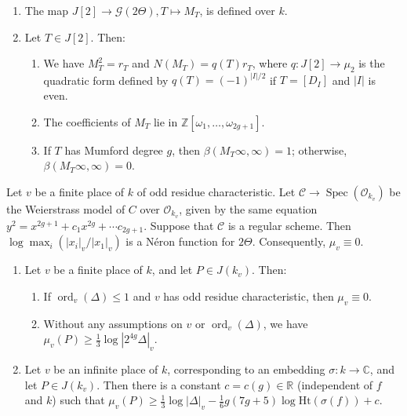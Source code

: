 \documentclass[10pt,a4paper]{amsart}
\DeclareMathOperator{\Spec}{Spec}
\DeclareMathOperator{\ord}{ord}
\newcommand{\R}{\mathbb{R}}
\newcommand{\Z}{\mathbb{Z}}
\newcommand{\bC}{\mathbb{C}}
\newcommand{\height}{\mathrm{Ht}}
\renewcommand{\O}{\mathcal{O}}
\begin{document}
\begin{corollary}\label{cor_properties_of_T_Heisenberg_matrices}
    \begin{enumerate}
        \item  The map $J[2] \to \mathcal{G}(2 \Theta), T \mapsto M_T$, is defined over $k$.
        \item Let $T \in J[2]$. Then:
        \begin{enumerate} \item We have $M_T^2 = r_T$ and $N(M_T) = q(T) r_T$, where $q : J[2] \to \mu_2$ is the quadratic form defined by $q(T) = (-1)^{|I| / 2}$ if $T = [D_I]$ and $|I|$ is even.
        \item The coefficients of $M_T$ lie in $\Z[\omega_1, \dots, \omega_{2g+1}]$.
        \item If $T$ has Mumford degree $g$, then $\beta(M_T \infty, \infty) = 1$; otherwise, $\beta(M_T \infty, \infty) = 0$.
        \end{enumerate}
    \end{enumerate}
\end{corollary}

\begin{theorem}\label{theorem_weierstrassmodelregular_muv_zero}
    Let $v$ be a finite place of $k$ of odd residue characteristic.
    Let $\mathcal{C}\rightarrow \Spec(\O_{k_v})$ be the Weierstrass model of $C$ over $\O_{k_v}$, given by the same equation $y^2 = x^{2g+1}+ c_1x^{2g} +\cdots c_{2g+1}$.
    Suppose that $\mathcal{C}$ is a regular scheme. 
    Then $\log \max_i(|x_i|_v/|x_1|_v)$ is a N\'eron function for $2\Theta$.
    Consequently, $\mu_v\equiv 0$. 
\end{theorem}

\begin{theorem}\label{thm_canonical_height_difference}
    \begin{enumerate} \item Let $v$ be a finite place of $k$, and let $P \in J(k_v)$. Then: 
    \begin{enumerate}
        \item If $\ord_v(\Delta) \leq 1$ and $v$ has odd residue characteristic, then $\mu_v \equiv 0$.
        \item Without any assumptions on $v$ or $\ord_v(\Delta)$, we have $\mu_v(P) \geq  \frac{1}{3} \log |2^{4 g} \Delta|_v$. 
    \end{enumerate}
    \item Let $v$ be an infinite place of $k$, corresponding to an embedding $\sigma : k \to \bC$, and let $P \in J(k_v)$. Then there is a constant $c = c(g) \in \R$ (independent of $f$ and $k$) such that $\mu_v(P) \geq \frac{1}{3} \log |\Delta|_v - \frac{1}{6} g(7g+5) \log \height(\sigma(f)) + c$.
    \end{enumerate} 
\end{theorem}
\end{document}
